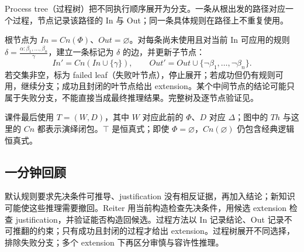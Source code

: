 
Process tree（过程树）把不同执行顺序展开为分支。一条从根出发的路径对应一个过程，节点记录该路径的 In 与 Out；同一条具体规则在路径上不重复使用。

根节点为 $In=Cn(\Phi)$、$Out=\varnothing$。对每条尚未使用且对当前 In 可应用的规则 $\delta=\frac{\alpha:\beta_1,\ldots,\beta_n}{\gamma}$，建立一条标记为 $\delta$ 的边，并更新子节点：
\[
 In'=Cn(In\cup\{\gamma\}),\qquad
 Out'=Out\cup\{\neg\beta_1,\ldots,\neg\beta_n\}.
\]
若交集非空，标为 failed leaf（失败叶节点），停止展开；若成功但仍有规则可用，继续分支；成功且封闭的叶节点给出 extension。某个中间节点的结论可能只属于失败分支，不能直接当成最终推理结果。完整树及逐节点验证见。

课件最后使用 $T=(W,D)$，其中 $W$ 对应此前的 $\Phi$、$D$ 对应 $\Delta$；图中的 $Th$ 与这里的 $Cn$ 都表示演绎闭包。$\top$ 是恒真式；即使 $\Phi=\varnothing$，$Cn(\varnothing)$ 仍包含经典逻辑恒真式。

\subsection{一分钟回顾}

默认规则要求先决条件可推导、justification 没有相反证据，再加入结论；新知识可能使这些推理需要撤回。Reiter 用当前构造检查先决条件，用候选 extension 检查 justification，并验证能否构造回候选。过程方法以 In 记录结论、Out 记录不可推翻的约束；只有成功且封闭的过程才给出 extension。过程树展开不同选择，排除失败分支；多个 extension 下再区分审慎与容许性推理。
\endgroup
